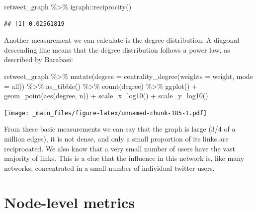 \documentclass[
]{book}
\newenvironment{Shaded}{\begin{snugshade}}{\end{snugshade}}
\newcommand{\AttributeTok}[1]{\textcolor[rgb]{0.77,0.63,0.00}{#1}}
\newcommand{\FunctionTok}[1]{\textcolor[rgb]{0.00,0.00,0.00}{#1}}
\newcommand{\NormalTok}[1]{#1}
\newcommand{\SpecialCharTok}[1]{\textcolor[rgb]{0.00,0.00,0.00}{#1}}
\newcommand{\StringTok}[1]{\textcolor[rgb]{0.31,0.60,0.02}{#1}}
\begin{document}
\begin{Shaded}
\begin{Highlighting}[]
\NormalTok{retweet\_graph }\SpecialCharTok{\%\textgreater{}\%}\NormalTok{ igraph}\SpecialCharTok{::}\FunctionTok{reciprocity}\NormalTok{()}
\end{Highlighting}
\end{Shaded}

\begin{verbatim}
## [1] 0.02561819
\end{verbatim}

Another measurement we can calculate is the degree distribution. A diagonal descending line means that the degree distribution follows a power law, as described by Barabasi:

\begin{Shaded}
\begin{Highlighting}[]
\NormalTok{retweet\_graph }\SpecialCharTok{\%\textgreater{}\%} \FunctionTok{mutate}\NormalTok{(}\AttributeTok{degree =} \FunctionTok{centrality\_degree}\NormalTok{(}\AttributeTok{weights  =}\NormalTok{ weight, }\AttributeTok{mode =} \StringTok{\textquotesingle{}all\textquotesingle{}}\NormalTok{)) }\SpecialCharTok{\%\textgreater{}\%} 
  \FunctionTok{as\_tibble}\NormalTok{() }\SpecialCharTok{\%\textgreater{}\%} \FunctionTok{count}\NormalTok{(degree) }\SpecialCharTok{\%\textgreater{}\%} \FunctionTok{ggplot}\NormalTok{() }\SpecialCharTok{+} \FunctionTok{geom\_point}\NormalTok{(}\FunctionTok{aes}\NormalTok{(degree, n)) }\SpecialCharTok{+} \FunctionTok{scale\_x\_log10}\NormalTok{() }\SpecialCharTok{+} \FunctionTok{scale\_y\_log10}\NormalTok{()}
\end{Highlighting}
\end{Shaded}

\texttt{[image: \_main\_files/figure-latex/unnamed-chunk-185-1.pdf]}

From these basic measurements we can say that the graph is large (3/4 of a million edges), it is not dense, and only a small proportion of its links are reciprocated. We also know that a very small number of users have the vast majority of links. This is a clue that the influence in this network is, like many networks, concentrated in a small number of individual twitter users.

\hypertarget{node-level-metrics-1}{%
\section{Node-level metrics}\label{node-level-metrics-1}}
\end{document}
